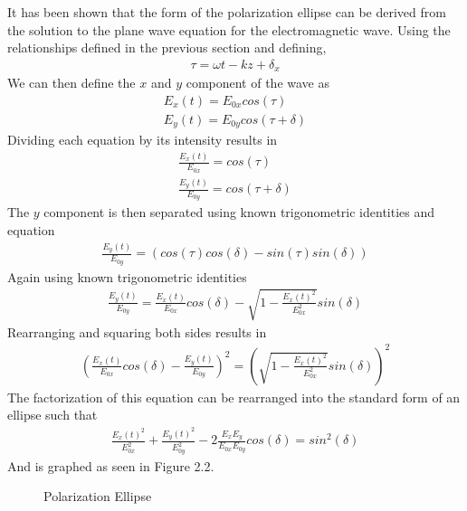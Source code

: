 It has been shown that the form of the polarization ellipse can be derived from the solution to the plane wave equation for the electromagnetic wave.  Using the relationships defined in the previous section and defining,
%
\begin{align}
    \tau=\omega t-kz+\delta_x
\end{align}
%
We can then define the $x$ and $y$ component of the wave as
%
\begin{align}
	E_x (t)=E_{0x} cos(\tau)\\
	E_y (t)=E_{0y} cos(\tau+\delta )
\end{align}
%
Dividing each equation by its intensity results in
%
\begin{align}
    \frac{E_x (t)}{E_{0x}} =cos(\tau) \\
    \frac{E_y (t)}{E_{0y}} =cos(\tau+\delta )
\end{align}
%
The $y$ component is then separated using known trigonometric identities and equation
%
\begin{align}
\frac{E_y (t)}{E_{0y}} =  (cos(\tau) cos(\delta)-sin(\tau)sin(\delta))
\end{align}
%
Again using known trigonometric identities
%
\begin{align}
    \frac{E_y (t)}{E_{0y}} = \frac{E_x (t)}{E_{0x}}   cos(\delta)-\sqrt{1-\frac{E_x (t)^2}{E_{0x}^2} } sin(\delta)
\end{align}
%
Rearranging and squaring both sides results in
%
\begin{align}
    (\frac{E_x (t)}{E_{0x}}   cos(\delta)-\frac{E_y (t)}{E_{0y}} )^2=(\sqrt{1-\frac{E_x (t)^2}{E_{0x}^2} } sin(\delta))^2
\end{align}
%
The factorization of this equation can be rearranged into the standard form of an ellipse such that
%
\begin{align}
    \frac{E_x (t)^2}{E_{0x}^2} +\frac{E_y (t)^2}{E_{0y}^2} -2 \frac{E_x E_y}{E_{0x} E_{0y} } cos(\delta)=sin^2 (\delta)
\end{align}
%
And is graphed as seen in Figure 2.2.
%
\begin{figure}
    \begin{center}
    \end{center}
    \caption{Polarization Ellipse}
    \label{fig:polarization}
\end{figure}
%

